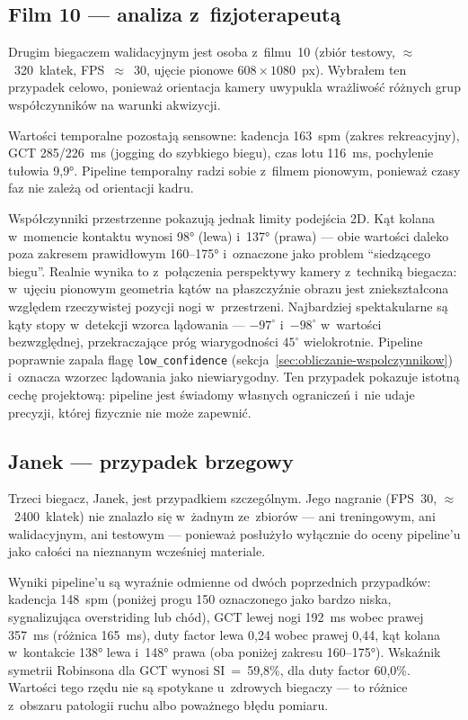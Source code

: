 \subsection{Film 10 --- analiza z~fizjoterapeutą}
\label{sec:case-film10}

Drugim biegaczem walidacyjnym jest osoba z~filmu~10 (zbiór testowy, $\approx$~320~klatek, FPS~$\approx$~30, ujęcie pionowe $608 \times 1080$~px). Wybrałem ten przypadek celowo, ponieważ orientacja kamery uwypukla wrażliwość różnych grup współczynników na warunki akwizycji.

Wartości temporalne pozostają sensowne: kadencja 163~spm (zakres rekreacyjny), GCT 285/226~ms (jogging do szybkiego biegu), czas lotu 116~ms, pochylenie tułowia 9{,}9°. Pipeline temporalny radzi sobie z~filmem pionowym, ponieważ czasy faz nie zależą od orientacji kadru.

Współczynniki przestrzenne pokazują jednak limity podejścia 2D. Kąt kolana w~momencie kontaktu wynosi 98° (lewa) i~137° (prawa) --- obie wartości daleko poza zakresem prawidłowym 160--175° i~oznaczone jako problem ``siedzącego biegu''. Realnie wynika to z~połączenia perspektywy kamery z~techniką biegacza: w~ujęciu pionowym geometria kątów na płaszczyźnie obrazu jest zniekształcona względem rzeczywistej pozycji nogi w~przestrzeni. Najbardziej spektakularne są kąty stopy w~detekcji wzorca lądowania --- $-97^\circ$ i~$-98^\circ$ w~wartości bezwzględnej, przekraczające próg wiarygodności $45^\circ$ wielokrotnie. Pipeline poprawnie zapala flagę \texttt{low\_confidence} (sekcja~\ref{sec:obliczanie-wspolczynnikow}) i~oznacza wzorzec lądowania jako niewiarygodny. Ten przypadek pokazuje istotną cechę projektową: pipeline jest świadomy własnych ograniczeń i~nie udaje precyzji, której fizycznie nie może zapewnić.

\subsection{Janek --- przypadek brzegowy}
\label{sec:case-janek}

Trzeci biegacz, Janek, jest przypadkiem szczególnym. Jego nagranie (FPS~30, $\approx$~2400~klatek) nie znalazło się w~żadnym ze~zbiorów --- ani treningowym, ani walidacyjnym, ani testowym --- ponieważ posłużyło wyłącznie do oceny pipeline'u jako całości na nieznanym wcześniej materiale.

Wyniki pipeline'u są wyraźnie odmienne od dwóch poprzednich przypadków: kadencja 148~spm (poniżej progu 150 oznaczonego jako bardzo niska, sygnalizująca overstriding lub chód), GCT lewej nogi 192~ms wobec prawej 357~ms (różnica 165~ms), duty factor lewa 0{,}24 wobec prawej 0{,}44, kąt kolana w~kontakcie 138° lewa i~148° prawa (oba poniżej zakresu 160--175°). Wskaźnik symetrii Robinsona dla GCT wynosi SI~=~59{,}8\%, dla duty factor 60{,}0\%. Wartości tego rzędu nie są spotykane u~zdrowych biegaczy --- to różnice z~obszaru patologii ruchu albo poważnego błędu pomiaru.

